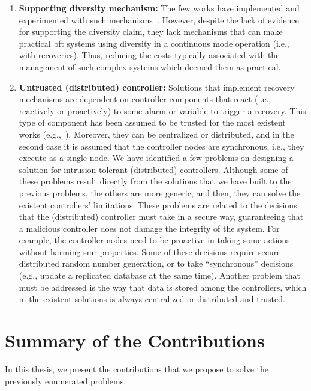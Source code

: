 \begin{enumerate}
\item \textbf{Supporting diversity mechanism:}
The few works have implemented and experimented with such mechanisms~\cite{Rodrigues:2001,Roeder:2010,Amir:2011}. 
However, despite the lack of evidence for supporting the diversity claim, they lack mechanisms that can make practical \gls{bft} systems using diversity in a continuous mode operation (i.e., with recoveries).  
Thus, reducing the costs typically associated with the management of such complex systems which deemed them as practical.


\item \textbf{Untrusted (distributed) controller:}
Solutions that implement recovery mechanisms are dependent on controller components that react (i.e., reactively or proactively) to some alarm or variable to trigger a recovery.
This type of component has been assumed to be trusted for the most existent works (e.g.,~\cite{Roeder:2010,Platania:2014,Sousa:2010}).
Moreover, they can be centralized or distributed, and in the second case it is assumed that the controller nodes are synchronous, i.e., they execute as a single node. 
We have identified a few problems on designing a solution for intrusion-tolerant (distributed) controllers. 
Although some of these problems result directly from the solutions that we have built to the previous problems, the others are more generic, and then, they can solve the existent controllers' limitations.
These problems are related to the decisions that the (distributed) controller must take in a secure way, guaranteeing that a malicious controller does not damage the integrity of the system.
For example, the controller nodes need to be proactive in taking some actions without harming \gls{smr} properties.
Some of these decisions require secure distributed random number generation, or to take ``synchronous'' decisions (e.g., update a replicated database at the same time).  
Another problem that must be addressed is the way that data is stored among the controllers, which in the existent solutions is always centralized or distributed and trusted. 


\end{enumerate}


\section{Summary of the Contributions}
\label{sec:contributions}


In this thesis, we present the contributions that we propose to solve the previously enumerated problems. 



